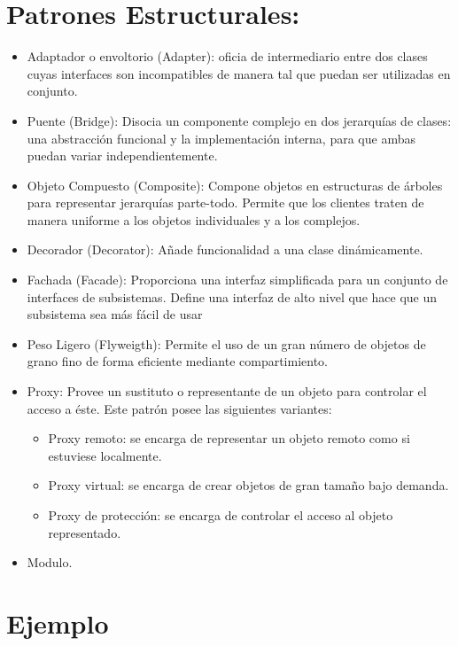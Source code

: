 \documentclass[10pt]{article}
\begin{document}
\newpage
\section{Patrones Estructurales:}
\begin{itemize}


\item Adaptador o envoltorio (Adapter): oficia de intermediario entre dos clases cuyas interfaces 
son incompatibles de manera tal que puedan ser utilizadas en 
conjunto. 
\item Puente (Bridge): Disocia un componente complejo en dos jerarquías de 
clases: una abstracción funcional y la implementación interna, para 
que ambas puedan variar independientemente.
\item Objeto Compuesto (Composite): Compone objetos en estructuras de árboles para 
representar jerarquías parte-todo. Permite que los clientes traten de 
manera uniforme a los objetos individuales y a los complejos. 
\item Decorador (Decorator): Añade funcionalidad a una clase dinámicamente.
\item Fachada (Facade): Proporciona una interfaz simplificada para un conjunto de 
interfaces de subsistemas. Define una interfaz de alto nivel que 
hace que un subsistema sea más fácil de usar
\item Peso Ligero (Flyweigth): Permite el uso de un gran número de objetos de grano 
fino de forma eficiente mediante compartimiento.
\item Proxy: Provee un sustituto o representante de un objeto para 
controlar el acceso a éste. Este patrón posee las siguientes variantes:
\begin{itemize} 
\item Proxy remoto: se encarga de representar un objeto remoto 
como si estuviese localmente. 
\item Proxy virtual: se encarga de crear objetos de gran tamaño bajo 
demanda. 
\item Proxy de protección: se encarga de controlar el acceso al objeto 
representado.
\end{itemize}

\item Modulo.

\end{itemize}






\newpage
\section{Ejemplo}
\end{document}
